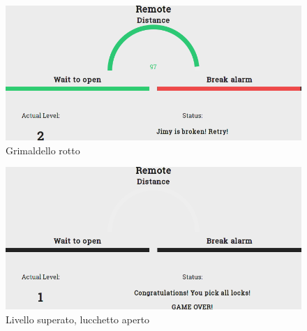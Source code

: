 \begin{figure}[!ht]
	\centering
	\includegraphics[scale=.25]{img/testing/game4.png}
	\caption{Grimaldello rotto}
\end{figure}

\begin{figure}[!ht]
	\centering
	\includegraphics[scale=.25]{img/testing/game5.png}
	\caption{Livello superato, lucchetto aperto}
\end{figure}

\newpage
